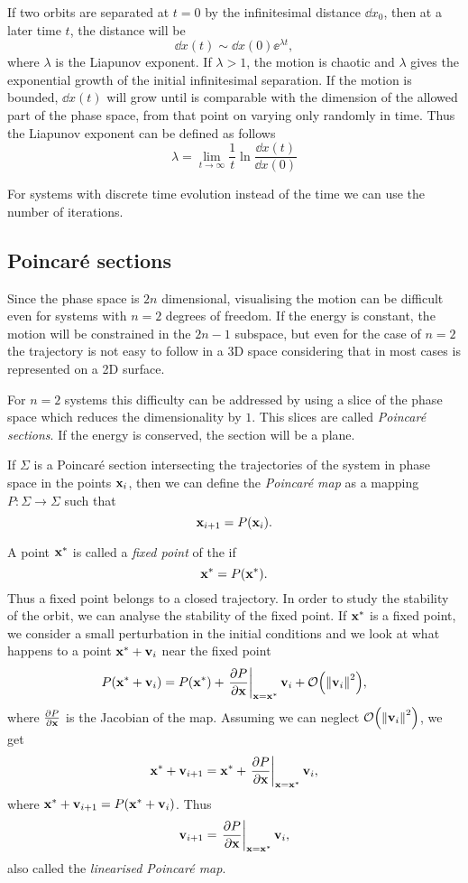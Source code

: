 \documentclass[../thesis.tex]{subfiles}
\theoremstyle{plain}
\begin{document}
If two orbits are separated at \(t=0\) by the infinitesimal distance \(\dd{x_0}\),
then at a later time \(t\), the distance will be
\[
  \dd{x}(t) \sim \dd{x}(0) \ee^{\lambda t},
\]
where \(\lambda \) is the Liapunov exponent.
If \(\lambda > 1\), the motion is chaotic and \(\lambda \) gives the exponential
growth of the initial infinitesimal separation. If the motion is bounded,
\(\dd{x}(t)\) will grow until is comparable with the dimension of the
allowed part of the phase space, from that point on varying only randomly in time.
Thus the Liapunov exponent can be defined as follows
\begin{equation}
  \label{eq:liapunov}
  \lambda = \lim_{t \to \infty} \frac{1}{t} \ln{\frac{\dd{x}(t)}{\dd{x}(0)}}
\end{equation}

For systems with discrete time evolution instead of the time we can use the number
of iterations.

\subsection{Poincaré sections}

Since the phase space is \(2n\) dimensional, visualising the motion can be
difficult even for systems with \(n=2\) degrees of freedom. If the energy is
constant, the motion will be constrained in the \(2n-1\) subspace, but even for
the case of \(n=2\) the trajectory is not easy to follow in a 3D space considering
that in most cases is represented on a 2D surface.

For \(n=2\) systems this difficulty can be addressed by using a slice of the phase
space which reduces the dimensionality by $1$. This slices are called
\emph{Poincaré sections}.
If the energy is conserved, the section will be a plane.

If \(\Sigma \) is a Poincaré section intersecting the trajectories of the system
in phase space in the points \(\vb{x}_i\), then we can define the \emph{Poincaré map}
as a mapping \({P:\Sigma \to \Sigma}\) such that
\[
  \vb{x}_{i+1} = P(\vb{x}_i).
\]

A point \(\vb{x}^*\) is called a \emph{fixed point} of the  if
\[
  \vb{x}^* = P(\vb{x}^*).
\]
Thus a fixed point belongs to a closed trajectory. In order to study the stability
of the orbit, we can analyse the stability of the fixed point.
If \(\vb{x}^*\) is a fixed point, we consider a small perturbation in the initial
conditions and we look at what happens to a point \(\vb{x}^* + \vb{v}_i\) near the fixed point
\[
  P(\vb{x}^* + \vb{v}_i) = P(\vb{x}^*) + \eval{\pdv{P}{\vb{x}}}_{\vb{x}=\vb{x}^*} \vb{v}_i + \order{\norm{\vb{v}_i}^2},
\]
where \(\pdv{P}{\vb{x}}\) is the Jacobian of the map.
Assuming we can neglect \(\order{\norm{\vb{v}_i}^2}\), we get
\[
  \vb{x}^* + \vb{v}_{i+1} = \vb{x}^* + \eval{\pdv{P}{\vb{x}}}_{\vb{x}=\vb{x}^*} \vb{v}_i,
\]
where \(\vb{x}^* + \vb{v}_{i+1} = P(\vb{x}^* + \vb{v}_i)\).%
Thus
\begin{equation}
  \label{eq:lin-map}
  \vb{v}_{i+1} = \eval{\pdv{P}{\vb{x}}}_{\vb{x}=\vb{x}^*} \vb{v}_i,
\end{equation}
also called the \emph{linearised Poincaré map}.
\end{document}

